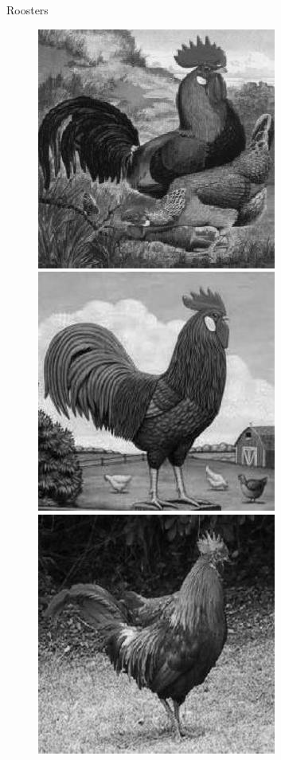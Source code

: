 \documentclass{beamer}
\begin{document}
\begin{frame}{Roosters}
  \begin{figure}
    \centering
    \includegraphics[scale=.4]{roosterrs-image_0001.jpg}
    \includegraphics[scale=.4]{roosterrs-image_0002.jpg} \\
    \includegraphics[scale=.4]{roosterrs-image_0003.jpg}

\end{figure}
\end{frame}
\end{document}
